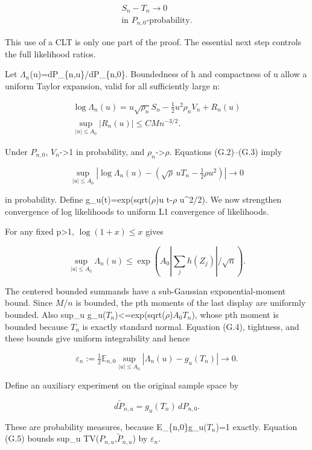\[
\begin{gathered}
S_n-T_n\longrightarrow0 \\
\text{in }P_{n,0}\text{-probability}.
\tag{G.2}
\end{gathered}
\]

This use of a CLT is only one part of the proof. The essential next step controls the full likelihood ratios.

Let \(\Lambda_n\)(u)=dP\_\{n,u\}/dP\_\{n,0\}. Boundedness of h and compactness of u allow a uniform Taylor expansion, valid for all sufficiently large n:

\[
\begin{gathered}
\log\Lambda_n(u)
=u\sqrt{\rho_n}S_n-\tfrac12u^2\rho_n V_n+R_n(u) \\
\sup_{|u|\le A_0}|R_n(u)|\le C M n^{-3/2}.
\tag{G.3}
\end{gathered}
\]

Under \(P_{n,0}\), \(V_n\)-\textgreater1 in probability, and \(\rho_n\)-\textgreater{}\(\rho\). Equations (G.2)--(G.3) imply

\[
\sup_{|u|\le A_0}
\left|\log\Lambda_n(u)-\left(\sqrt\rho\,uT_n-\tfrac12\rho u^2\right)\right|
\longrightarrow0
\tag{G.4}
\]

in probability. Define g\_u(t)=exp(sqrt(\(\rho\))u t-\(\rho\) u\^{}2/2). We now strengthen convergence of log likelihoods to uniform L1 convergence of likelihoods.

For any fixed p\textgreater1, \(\log(1+x)\le x\) gives

\[
\sup_{|u|\le A_0}\Lambda_n(u)
\le\exp\left(A_0\left|\sum_jh(Z_j)\right|/\sqrt n\right).
\]

The centered bounded summands have a sub-Gaussian exponential-moment bound. Since \(M/n\) is bounded, the pth moments of the last display are uniformly bounded. Also sup\_u g\_u(\(T_n\))\textless=exp(sqrt(\(\rho\))\(A_0\)\textbar{}\(T_n\)\textbar), whose pth moment is bounded because \(T_n\) is exactly standard normal. Equation (G.4), tightness, and these bounds give uniform integrability and hence

\[
\varepsilon_n:=\tfrac12\mathbb E_{n,0}
\sup_{|u|\le A_0}|\Lambda_n(u)-g_u(T_n)|\longrightarrow0.
\tag{G.5}
\]

Define an auxiliary experiment on the original sample space by

\[
d\widetilde P_{n,u}=g_u(T_n)\,dP_{n,0}.
\]

These are probability measures, because E\_\{n,0\}g\_u(\(T_n\))=1 exactly. Equation (G.5) bounds sup\_u TV(\(P_{n,u}\),\(\widetilde P_{n,u}\)) by \(\varepsilon_n\).

